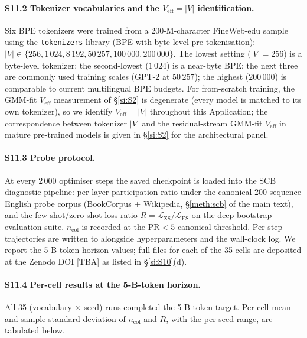 \documentclass[11pt,a4paper]{article}
\begin{document}
\paragraph{S11.2 Tokenizer vocabularies and the
$V_\mathrm{eff}\!=\!|V|$ identification.}
Six BPE tokenizers were trained from a 200-M-character FineWeb-edu
sample using the \texttt{tokenizers} library (BPE with byte-level
pre-tokenisation): $|V| \in \{256, 1\,024, 8\,192, 50\,257,
100\,000, 200\,000\}$. The lowest setting ($|V|\!=\!256$) is a
byte-level tokenizer; the second-lowest ($1\,024$) is a near-byte
BPE; the next three are commonly used training scales (GPT-2 at
$50\,257$); the highest ($200\,000$) is comparable to current
multilingual BPE budgets. For from-scratch training, the GMM-fit
$V_\mathrm{eff}$ measurement of \S\ref{si:S2} is degenerate
(every model is matched to its own tokenizer), so we identify
$V_\mathrm{eff}\!=\!|V|$ throughout this Application; the
correspondence between tokenizer $|V|$ and the residual-stream
GMM-fit $V_\mathrm{eff}$ in mature pre-trained models is given in
\S\ref{si:S2} for the architectural panel.

\paragraph{S11.3 Probe protocol.}
At every $2\,000$ optimiser steps the saved checkpoint is loaded
into the SCB diagnostic pipeline: per-layer participation ratio
under the canonical 200-sequence English probe corpus
(BookCorpus + Wikipedia, \S\ref{meth:scb} of the main text), and
the few-shot/zero-shot loss ratio
$R \!=\! \mathcal{L}_\mathrm{ZS}/\mathcal{L}_\mathrm{FS}$ on the
deep-bootstrap evaluation suite. $n_\mathrm{col}$ is recorded at
the $\mathrm{PR}\!<\!5$ canonical threshold. Per-step trajectories
are written to  alongside hyperparameters and
the wall-clock log. We report the 5-B-token horizon values; full
 files for each of the 35 cells are deposited
at the Zenodo DOI [TBA] as listed in \S\ref{si:S10}(d).

\paragraph{S11.4 Per-cell results at the 5-B-token horizon.}
All 35 (vocabulary $\times$ seed) runs completed the 5-B-token
target. Per-cell mean and sample standard deviation of
$n_\mathrm{col}$ and $R$, with the per-seed range, are tabulated
below.
\end{document}
